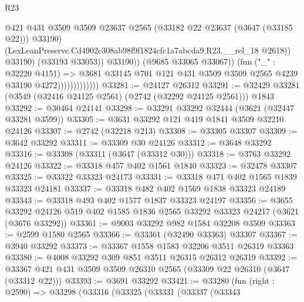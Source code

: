 \begin{lexlean}{R23}
\begin{coremodule}
                                          @421
                                          @431
                                          @3509
                                          @3509
                                          @23637
                                          @2565
                                          (@33182 @22 @23637 (@3647 (@33185 @22)))
                                          @33190)
                                        (LexLeanPreserve.Cd4902c308ab98f9f1824cfc1a7abcda9.R23.__rel_18
                                          @2618))
                                      @33190)
                                    (@33193 @33053))
                                  @33190))
                              (@9685 @33065 @33067))
                            (fun ("_" : @32220 @4151) =>
                            @3681
                              @33145
                              @701
                              @121
                              @431
                              @3509
                              @3509
                              @2565
                              @4239
                              @33190
                              @4272)))))))))))))
@33281 := @24127 @26312
@33291 := @32429 @33281 (@3549 (@32416 @24125 @2561) (@2742 (@32292 @24125 @2561))) @1843
@33292 := @30464 @24141
@33298 := @33291 @33292 @32444 (@3621 (@32447 @33281 @3599))
@33305 := @3631 @33292 @121 @419 @1841 @3509 @32210 @24126
@33307 := @2742 (@32218 @213)
@33308 := @33305 @33307
@33309 := @3642 @33292
@33311 := @33309 @30 @24126
@33312 := @3648 @33292
@33316 := @33308 (@33311 (@3647 (@33312 @30)))
@33318 := @3763 @33292 @24126
@33322 := @33318 @457 @402 @1561 @1840
@33323 := @32478 @33307
@33325 := @33322 @33323 @24173
@33331 := @33318 @471 @402 @1565 @1839 @33323 @24181
@33337 := @33318 @482 @402 @1569 @1838 @33323 @24189
@33343 := @33318 @493 @402 @1577 @1837 @33323 @24197
@33356 := @3655
    @33292
    @24126
    @519
    @402
    @1585
    @1836
    @2565
    @33292
    @33323
    @24217
    (@3621 (@3676 @33292))
@33361 := @9003 @33292 @982 @1584 @32208 @3509
@33363 := @2599 @1580 @2565
@33366 := @33361 (@32490 @33363) @33307
@33367 := @3940 @33292
@33373 := @33367 @1558 @1583 @32206 @3511 @26319 @33363
@33380 := @4008 @33292 @309 @851 @3511 @26315 @26312 @26319
@33392 := @33367 @421 @431 @3509 @3509 @26310 @2565 (@33309 @22 @26310 (@3647 (@33312 @22)))
@33393 := @3691 @33292
@33421 := @33280
    (fun (right : @2590) =>
    @33298
      (@33316
        (@33325
          (@33331
            (@33337
              (@33343

\end{coremodule}
\end{lexlean}

